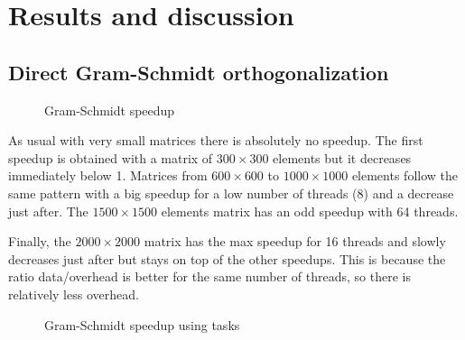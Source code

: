 \chapter{Results and discussion}

\section{Direct Gram-Schmidt orthogonalization}

\begin{figure}[ht]
  \begin{center}
  \end{center}
  \caption{Gram-Schmidt speedup}
  \label{fig:gram_speedup}
\end{figure} 

As usual with very small matrices there is absolutely no speedup. The first speedup is obtained with a matrix of $300\times 300$ elements but it decreases immediately below 1. Matrices from $600\times 600$ to $1000\times 1000$ elements follow the same pattern with a big speedup for a low number of threads (8) and a decrease just after. The $1500\times 1500$ elements matrix has an odd speedup with 64 threads.

Finally, the $2000\times 2000$ matrix has the max speedup for 16 threads and slowly decreases just after but stays on top of the other speedups. This is because the ratio data/overhead is better for the same number of threads, so there is relatively less overhead.

\begin{figure}[ht]
  \begin{center}
  \end{center}
  \caption{Gram-Schmidt speedup using tasks}
  \label{fig:gram_speedup_task}
\end{figure} 


